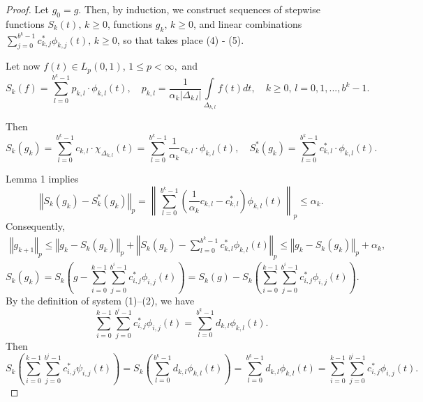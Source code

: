 \documentclass[
11pt,%
tightenlines,%
twoside,%
onecolumn,%
nofloats,%
nobibnotes,%
nofootinbib,%
superscriptaddress,%
noshowpacs,%
centertags]%
{revtex4}
\begin{document}
\begin{proof}
 Let $ g_0 = g $. Then, by induction,
we construct sequences of stepwise functions
$ {S_k (t)}, \, k \ge 0 $,
functions $ g_k, \, k \ge 0 $, and linear combinations $ \sum_{j =
    0}^{b^k-1} c^{\ast}_{k, j} \phi_ {k, j} (t), \, k \ge 0 $, so that
takes place (4) - (5).

Let now $f(t) \in L_p (0,1)$, $1\le p < \infty,$ and
$$
S_k \left( f\right) = \sum_{l=0}^{b^k-1} p_{k,l} \cdot
\phi_{k,l}(t), \quad
p_{k,l}=\frac{1}{\alpha_k\left\vert\Delta_{k.l}\right\vert}\int\limits_{\Delta_{k,l}}
f(t) dt,\quad
k\ge 0, \, l=0,1,...,b^k -1 .
$$

Then
$$
S_k\left( g_{k}\right) = \sum_{l=0}^{b^k-1} c_{k,l}\cdot \chi_{{\Delta}_{k,l}}(t)=
\sum_{l=0}^{b^k-1} \frac{1}{\alpha_k}   c_{k,l} \cdot  \phi_{k,l}(t),
\quad S_k^{\ast} \left( g_{k}\right) = \sum_{l=0}^{b^k-1}
c^{\ast}_{k,l} \cdot \phi_{k,l}(t).
$$

Lemma 1 implies
$$
\left\Vert S_{k}(g_{k})- S_k^{\ast}(g_{k}) \right\Vert_p =
\left\|  \sum_{l=0}^{b^k-1}
\left( \frac{1}{\alpha_k}      c_{k,l}- c^{\ast}_{k,l} \right)  \phi_{k,l}(t) \right\|_p
\le \alpha_k.
$$
Consequently,
\begin{eqnarray}
    \left\Vert g_{k+1} \right\Vert_p \le
    \left\Vert g_{k} - S_k(g_{k}) \right\Vert_p+
    \left\Vert S_k(g_{k}) -
    \sum_{l=0}^{b^k-1} c^{\ast}_{k,l}  \phi_{k,l}(t) \right\Vert_p \le
    \left\Vert g_{k} - S_k(g_{k}) \right\Vert_p +\alpha_k,
\end{eqnarray}
\begin{equation*}
    S_k(g_{k}) =
    S_k\left(  g-\sum_{i=0}^{k-1}   \sum_{j=0}^{b^i-1} c^{\ast}_{i,j} \phi_{i,j}(t) \right)=
    S_k(g) -  S_k\left(  \sum_{i=0}^{k-1}   \sum_{j=0}^{b^i-1} c^{\ast}_{i,j}  \phi_{i,j}(t) \right) .
\end{equation*}
By the definition of system (1)--(2), we have
$$
\sum_{i=0}^{k-1}   \sum_{j=0}^{b^i-1} c^{\ast}_{i,j}  \phi_{i,j}(t) =
\sum_{l=0}^{b^k-1} d_{k,l}  \phi_{k,l}(t).
$$
Then
\begin{equation*}
    S_k \left(  \sum_{i=0}^{k-1}   \sum_{j=0}^{b^i-1} c^{\ast}_{i,j}  \psi_{i,j}(t) \right)  =
    S_k \left(  \sum_{l=0}^{b^k-1} d_{k,l}  \phi_{k,l}(t)    \right) =
    \sum_{l=0}^{b^k-1} d_{k,l}  \phi_{k,l}(t) =
    \sum_{i=0}^{k-1}   \sum_{j=0}^{b^i-1} c^{\ast}_{i,j}  \phi_{i,j}(t).
\end{equation*}


\end{proof}
\end{document}
